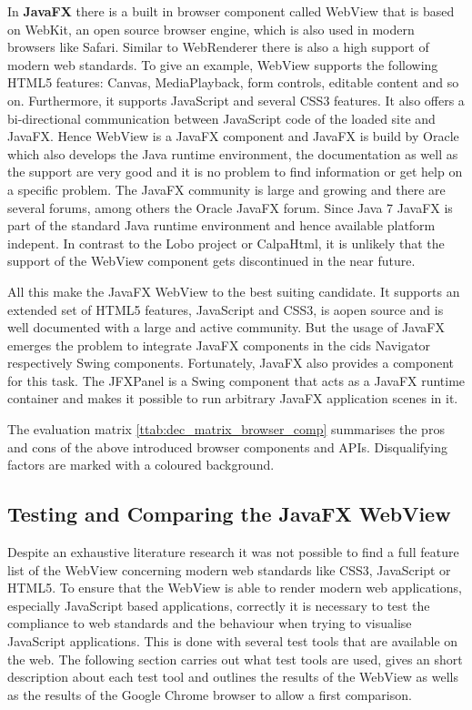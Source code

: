 In \textbf{JavaFX} there is a built in browser component called WebView that is based on WebKit, an open source browser engine, which is also used in modern browsers like Safari.
Similar to WebRenderer there is also a high support of modern web standards.
To give an example, WebView supports the following HTML5 features: Canvas, MediaPlayback, form controls, editable content and so on.
Furthermore, it supports JavaScript and several CSS3 features.
It also offers a bi-directional communication between JavaScript code of the loaded site and JavaFX.
Hence WebView is a JavaFX component and JavaFX is build by Oracle which also develops the Java runtime environment, the documentation as well as the support are very good and it is no problem to find information or get help on a specific problem.
The JavaFX community is large and growing and there are several forums, among others the Oracle JavaFX forum.
Since Java 7 JavaFX is part of the standard Java runtime environment and hence available platform indepent.
In contrast to the Lobo project or CalpaHtml, it is unlikely that the support of the WebView component gets discontinued in the near future.

All this make the JavaFX WebView to the best suiting candidate. It supports an extended set of HTML5 features, JavaScript and CSS3, is aopen source and is well documented with a large and active community.
But the usage of JavaFX emerges the problem to integrate JavaFX components in the cids Navigator respectively Swing components.
Fortunately, JavaFX also provides a component for this task.
The JFXPanel is a Swing component that acts as a JavaFX runtime container and makes it possible to run arbitrary JavaFX application scenes in it.
 

The evaluation matrix \ref{ttab:dec_matrix_browser_comp} summarises the pros and cons of the above introduced browser components and APIs. Disqualifying factors are marked with a coloured background.



\subsection{Testing and Comparing the JavaFX WebView}\label{chap:browser_api_testing}

Despite an exhaustive literature research it was not possible to find a full feature list of the WebView concerning modern web standards like CSS3, JavaScript or HTML5.
To ensure that the WebView is able to render modern web applications, especially JavaScript based applications, correctly it is necessary to test the compliance to web standards and the behaviour when trying to visualise JavaScript applications.
This is done with several test tools that are available on the web.
The following section carries out what test tools are used, gives an short description about each test tool and outlines the results of the WebView as wells as the results of the Google Chrome browser to allow a first comparison.

